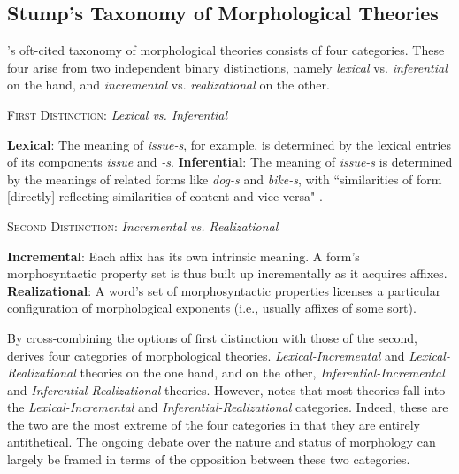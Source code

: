 \subsection{Stump's Taxonomy of Morphological Theories}
\cite{stump:2001}'s oft-cited taxonomy of morphological theories 
consists of four categories. These four arise from two independent 
binary distinctions, namely \emph{lexical} vs. \emph{inferential} on the hand, and \emph{incremental} vs. \emph{realizational} on the other.
 
\begin{exe}
\ex \textsc{First Distinction}: \textit{Lexical vs. Inferential} 
\begin{xlist}
	\ex \textbf{Lexical}: The meaning of \textit{issue-s}, for example, is determined by the lexical entries of its components \textit{issue} and \textit{-s}.
	\ex \textbf{Inferential}: The meaning of \textit{issue-s} is determined by the meanings of related forms like \textit{dog-s} and \textit{bike-s},
with ``similarities of form [directly] reflecting similarities of content and vice versa" \citep[][p. 2]{anderson:2015shorthist}. \label{ex:d-one-b}
	\end{xlist}
\ex \textsc{Second Distinction}: \textit{Incremental vs. Realizational} 
\begin{xlist} 
	\ex \textbf{Incremental}: Each affix has its own intrinsic meaning. 
	A form's morphosyntactic property set is thus built up incrementally as it acquires affixes.
	\label{ex:d-two-a}
	\ex \textbf{Realizational}: A word's set of morphosyntactic properties 
	licenses a particular configuration of morphological exponents 
	(i.e., usually affixes of some sort). 
	\end{xlist}
\end{exe}

By cross-combining the options of first distinction with those of the second, 
\cite{stump:2001} derives four categories of morphological theories. 
\emph{Lexical-Incremental} and \emph{Lexical-Realizational} theories 
on the one hand, and on the other, \emph{Inferential-Incremental} and 
\emph{Inferential-Realizational} theories. However, \citep{anderson:2017} 
notes that most theories fall into the \emph{Lexical-Incremental} and 
\emph{Inferential-Realizational} categories. Indeed, these are the two are 
the most extreme of the four categories in that they are entirely antithetical. 
The ongoing debate over the nature and status of morphology can largely 
be framed in terms of the opposition between these two categories. 


